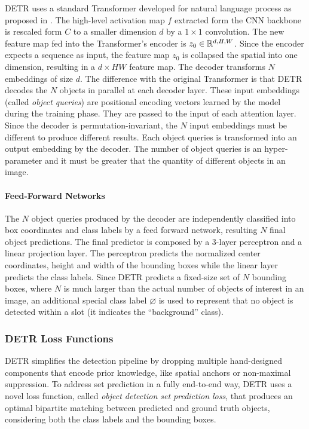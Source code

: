 DETR \cite{detr} uses a standard Transformer developed for natural language process as proposed in \cite{transformer}. The high-level activation map $f$ extracted form the CNN backbone is rescaled form $C$ to a smaller dimension $d$ by a $1\times1$ convolution. The new feature map fed into the Transformer's encoder is $z_0 \in \mathbb{R}^{d, H, W}$. Since the encoder expects a sequence as input, the feature map $z_0$ is collapsed the spatial into one dimension, resulting in a $d\times HW$ feature map. The decoder transforms $N$ embeddings of size $d$.  The difference with the original Transformer \cite{transformer} is that DETR decodes the $N$ objects in parallel at each decoder layer. These input embeddings (called \textit{object queries}) are positional encoding vectors learned by the model during the training phase. They are passed to the input of each attention layer. Since the decoder is permutation-invariant, the $N$ input embeddings must be different to produce different results. Each object queries is transformed into an output embedding by the decoder. The number of object queries is an hyper-parameter and it must be greater that the quantity of different objects in an image.

\paragraph{Feed-Forward Networks} The $N$ object queries produced by the decoder are  independently classified into box coordinates and class labels by
a feed forward network, resulting $N$ final object predictions. The final predictor is composed by a 3-layer perceptron and a linear projection layer. The perceptron predicts the normalized center coordinates, height and width of the bounding boxes while the linear layer predicts the class labels. Since DETR predicts a
fixed-size set of $N$ bounding boxes, where $N$ is much larger than the
actual number of objects of interest in an image, an additional special class label $\varnothing$ is used to represent that no object is detected within a slot (it indicates the ``background'' class).

\subsubsection{DETR Loss Functions}
\label{sec:detrlosses}

DETR \cite{detr} simplifies the detection pipeline by dropping multiple hand-designed components that encode prior knowledge, like spatial anchors or non-maximal suppression. To address set prediction in a fully end-to-end way, DETR uses a novel loss function, called \textit{object detection set prediction loss}, that produces
an optimal bipartite matching between predicted and ground truth objects, considering both the class labels and the bounding boxes.


